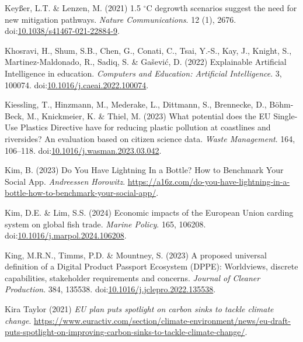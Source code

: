 \documentclass[
  letterpaper,
  DIV=11,
  numbers=noendperiod]{scrartcl}
\newlength{\cslhangindent}
\newenvironment{CSLReferences}[2] %
 {\begin{list}{}{%
  \setlength{\itemindent}{0pt}
  \setlength{\leftmargin}{0pt}
  \setlength{\parsep}{0pt}
  \ifodd #1
   \setlength{\leftmargin}{\cslhangindent}
   \setlength{\itemindent}{-1\cslhangindent}
  \fi
  \setlength{\itemsep}{#2\baselineskip}}}
 {\end{list}}
\begin{document}
\begin{CSLReferences}{0}{1}
Keyßer, L.T. \& Lenzen, M. (2021) 1.5 {\(^\circ\)}{C} degrowth scenarios
suggest the need for new mitigation pathways. \emph{Nature
Communications}. 12 (1), 2676.
doi:\href{https://doi.org/10.1038/s41467-021-22884-9}{10.1038/s41467-021-22884-9}.

Khosravi, H., Shum, S.B., Chen, G., Conati, C., Tsai, Y.-S., Kay, J.,
Knight, S., Martinez-Maldonado, R., Sadiq, S. \& Gašević, D. (2022)
Explainable {Artificial Intelligence} in education. \emph{Computers and
Education: Artificial Intelligence}. 3, 100074.
doi:\href{https://doi.org/10.1016/j.caeai.2022.100074}{10.1016/j.caeai.2022.100074}.

Kiessling, T., Hinzmann, M., Mederake, L., Dittmann, S., Brennecke, D.,
Böhm-Beck, M., Knickmeier, K. \& Thiel, M. (2023) What potential does
the {EU Single-Use Plastics Directive} have for reducing plastic
pollution at coastlines and riversides? {An} evaluation based on citizen
science data. \emph{Waste Management}. 164, 106--118.
doi:\href{https://doi.org/10.1016/j.wasman.2023.03.042}{10.1016/j.wasman.2023.03.042}.

Kim, B. (2023) Do {You Have Lightning In} a {Bottle}? {How} to
{Benchmark Your Social App}. \emph{Andreessen Horowitz}.
\url{https://a16z.com/do-you-have-lightning-in-a-bottle-how-to-benchmark-your-social-app/}.

Kim, D.E. \& Lim, S.S. (2024) Economic impacts of the {European Union}
carding system on global fish trade. \emph{Marine Policy}. 165, 106208.
doi:\href{https://doi.org/10.1016/j.marpol.2024.106208}{10.1016/j.marpol.2024.106208}.

King, M.R.N., Timms, P.D. \& Mountney, S. (2023) A proposed universal
definition of a {Digital Product Passport Ecosystem} ({DPPE}):
{Worldviews}, discrete capabilities, stakeholder requirements and
concerns. \emph{Journal of Cleaner Production}. 384, 135538.
doi:\href{https://doi.org/10.1016/j.jclepro.2022.135538}{10.1016/j.jclepro.2022.135538}.

Kira Taylor (2021) \emph{{EU} plan puts spotlight on carbon sinks to
tackle climate change}.
\url{https://www.euractiv.com/section/climate-environment/news/eu-draft-puts-spotlight-on-improving-carbon-sinks-to-tackle-climate-change/}.


\end{CSLReferences}
\end{document}
